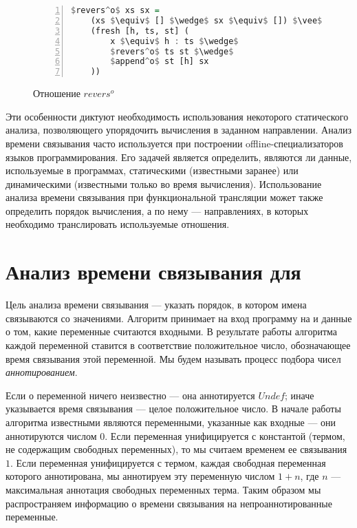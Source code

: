 \documentclass[conference,american,russian]{IEEEtran}
\begin{document}
\begin{figure}[h!]
  \begin{center}
  \begin{minipage}{0.35\textwidth}
  \begin{lstlisting}[language=Haskell, frame=single, numbers=left,numberstyle=\small, escapechar=|]
  $revers^o$ xs sx =
    (xs $\equiv$ [] $\wedge$ sx $\equiv$ []) $\vee$
    (fresh [h, ts, st] (
        x $\equiv$ h : ts $\wedge$
        $revers^o$ ts st $\wedge$
        $append^o$ st [h] sx
    ))
    \end{lstlisting}
  \end{minipage}
  \end{center}
  \caption{Отношение $revers^o$}
  \label{lst:reversoDEF}
\end{figure}

Эти особенности диктуют необходимость использования некоторого статического анализа, позволяющего упорядочить вычисления в заданном направлении. 
Анализ времени связывания часто используется при построении offline-специализаторов языков программирования. 
Его задачей является определить, являются ли данные, используемые в программах, статическими (известными заранее) или динамическими (известными только во время вычисления).
Использование анализа времени связывания при функциональной трансляции может также определить порядок вычисления, а по нему --- направлениях, в которых необходимо транслировать используемые отношения. 

\section{Анализ времени связывания для \miniKanren{}}\label{bta}

Цель анализа времени связывания --- указать порядок, в котором имена связываются со значениями.
Алгоритм принимает на вход программу на \miniKanren{} и данные о том, какие переменные считаются входными. 
В результате работы алгоритма каждой переменной ставится в соответствие положительное число, обозначающее время связывания этой переменной.
Мы будем называть процесс подбора чисел \emph{аннотированием}.

Если о переменной ничего неизвестно --- она аннотируется $Undef$; иначе указывается время связывания --- целое положительное число.
В начале работы алгоритма известными являются переменными, указанные как входные --- они аннотируются числом $0$.
Если переменная унифицируется с константой (термом, не содержащим свободных переменных), то мы считаем временем ее связывания $1$. 
Если переменная унифицируется с термом, каждая свободная переменная которого аннотирована, мы аннотируем эту переменную числом $1+n$, где $n$ --- максимальная аннотация свободных переменных терма. 
Таким образом мы распространяем информацию о времени связывания на непроаннотированные переменные.
\end{document}
